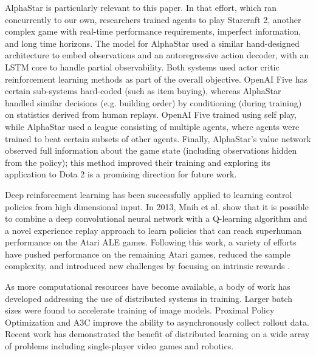 \documentclass[11pt]{article}
\newcommand{\dota}{Dota 2\xspace}
\newcommand{\openaifive}{OpenAI Five\xspace}
\begin{document}
AlphaStar is particularly relevant to this paper.
In that effort, which ran concurrently to our own, researchers trained agents to play Starcraft 2, another complex game with real-time performance requirements, imperfect information, and long time horizons.
The model for AlphaStar used a similar hand-designed architecture to embed observations and an autoregressive action decoder, with an LSTM core to handle partial observability. 
Both systems used actor critic reinforcement learning methods as part of the overall objective.
\openaifive has certain sub-systems hard-coded (such as item buying), whereas AlphaStar handled similar decisions (e.g. building order) by conditioning (during training) on statistics derived from human replays.
\openaifive trained using self play, while AlphaStar used a league consisting of multiple agents, where agents were trained to beat certain subsets of other agents.
Finally, AlphaStar's value network observed full information about the game state (including observations hidden from the policy); this method improved their training and exploring its application to \dota is a promising direction for future work. 


Deep reinforcement learning has been successfully applied to learning control policies from high dimensional input. 
In 2013, Mnih et al.\cite{mnih2013playing} show that it is possible to combine a deep convolutional neural network with a Q-learning algorithm\cite{watkins1992q} and a novel experience replay approach to learn policies that can reach superhuman performance on the Atari ALE games. 
Following this work, a variety of efforts have pushed performance on the remaining Atari games\cite{mnih2016asynchronous}, reduced the sample complexity, and introduced new challenges by focusing on intrinsic rewards \cite{kulkarni2016hierarchical,burda2018exploration,ecoffet2018montezuma}.

As more computational resources have become available, a body of work has developed addressing the use of distributed systems in training.
Larger batch sizes were found to accelerate training of image models\cite{Goyal2017Imagenet, You2017Imagenet, You2018minutenet}.
Proximal Policy Optimization\cite{schulman2017proximal} and
A3C \cite{mnih2016a3c} improve the ability to asynchronously collect rollout data. 
Recent work has demonstrated the benefit of distributed learning on a wide array of problems including single-player video games\cite{espeholt2018impala} and robotics\cite{dactyl}.
\end{document}
